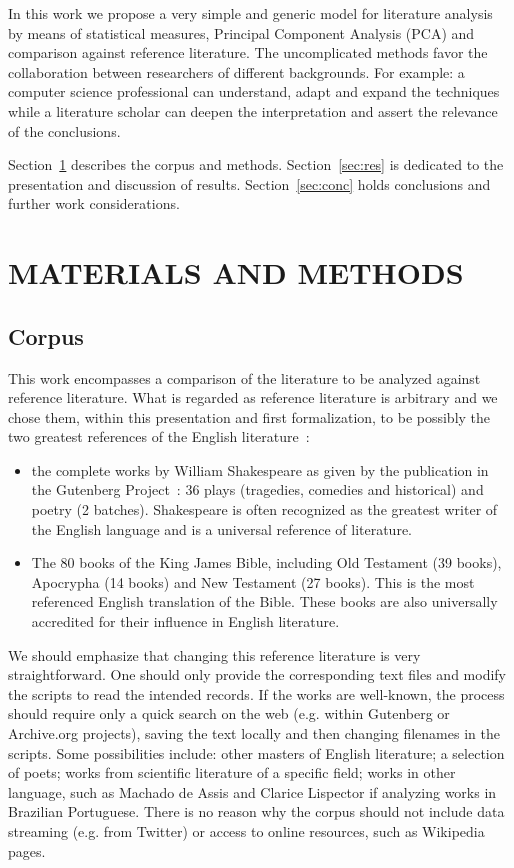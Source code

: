 \documentclass[12pt,fleqn]{article}
\begin{document}
In this work we propose a very simple and generic model for literature analysis
by means of statistical measures, Principal Component Analysis (PCA) and comparison against
reference literature.
The uncomplicated methods favor the collaboration between researchers of different backgrounds.
For example: a computer science professional can understand, adapt and expand the techniques
while a literature scholar can deepen the interpretation and assert the relevance of the conclusions.

Section~\ref{sec:matMet} describes the corpus and methods.
Section~\ref{sec:res} is dedicated to the presentation and discussion of results.
Section~\ref{sec:conc} holds conclusions and further work considerations.

\section{MATERIALS AND METHODS}\label{sec:matMet}
\subsection{Corpus}
This work encompasses a comparison of the literature to be analyzed against
reference literature.
What is regarded as reference literature is arbitrary and we chose them,
within this presentation and first formalization, to be
possibly the two greatest references of the English literature~\citep{bib,shake}:

\begin{itemize}
    \item the complete works by William Shakespeare as given by the
        publication in the Gutenberg Project~\citep{shakWhole}:
        36 plays (tragedies, comedies and historical) and poetry (2 batches).
        Shakespeare is often recognized as the greatest writer of the English language
        and is a universal reference of literature.
    \item The 80 books of the King James Bible, including Old Testament (39 books),
        Apocrypha (14 books) and New Testament (27 books).
        This is the most referenced English translation of the Bible.
        These books are also universally accredited for their influence in English literature.
\end{itemize}

We should emphasize that changing this reference literature is very straightforward.
One should only provide the corresponding text files and modify the scripts to read the
intended records.
If the works are well-known, the process should require only a quick search on the web
(e.g. within Gutenberg or Archive.org projects), saving the text locally and then changing
filenames in the scripts.
Some possibilities include: other masters of English literature;
a selection of poets; works from scientific literature of a specific field;
works in other language, such as Machado de Assis and Clarice Lispector
if analyzing works in Brazilian Portuguese.
There is no reason why the corpus should not include data streaming (e.g. from Twitter)
or access to online resources,
such as Wikipedia pages.
\end{document}
